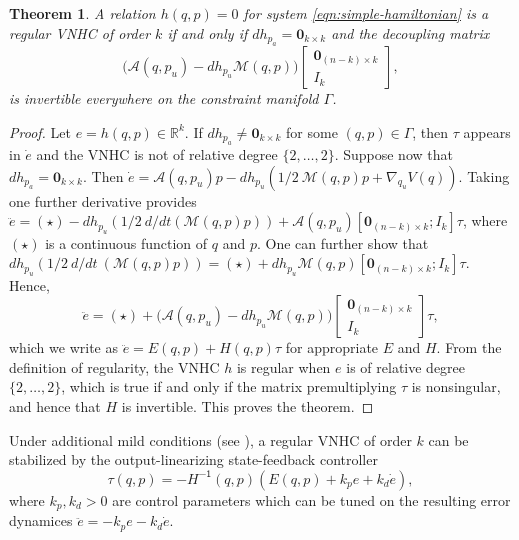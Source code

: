 \documentclass[journal,twoside,web, twocolumn,draftcls]{ieeecolor}
\newtheorem{thm}{Theorem}%
\newcommand*{\inv}{^\mathsf{-1}}
\newcommand*{\R}{\mathbb{R}}
\newcommand*{\Id}[1]{I_{#1}}
\newcommand*{\Zmat}[1]{\bm{0}_{#1}}
\newcommand*{\simpleB}{\begin{bmatrix}\Zmat{(n-k)\times k}\\ \Id{k}\end{bmatrix}}
\begin{document}
\begin{thm}\label{thm:vnhc-regularity}
    A relation \(h(q,p) = 0\) for system \eqref{eqn:simple-hamiltonian}
    is a regular VNHC of order \(k\) if and only if 
    \(dh_{p_a} = \Zmat{k \times k}\) 
    and the decoupling matrix
    \begin{equation}\label{eqn:decoupling-matrix}
        \big(\mathcal{A}(q,p_u) - dh_{p_u}\mathcal{M}(q,p)\big)\simpleB
         ,
     \end{equation}
    is invertible everywhere on the constraint manifold \(\Gamma\).
\end{thm}
\begin{proof}
    Let \(e = h(q,p) \in \R^k\).
    If \(dh_{p_a} \neq \Zmat{k\times k}\) for some \((q,p) \in \Gamma\), 
    then \(\tau\) appears in \(\dot{e}\) and the VNHC is not of relative degree
    \(\{2,\ldots,2\}\). Suppose now that \(dh_{p_a} = \Zmat{k\times k}\).
    Then 
    \(\dot{e} = \mathcal{A}(q,p_u)p - 
     dh_{p_u}\left(1/2~\mathcal{M}(q,p)p + \nabla_{q_u}V(q)\right)\).
    Taking one further derivative provides
    \( \ddot{e} = (\star) - 
        dh_{p_u}\left(1/2~d/dt\left(\mathcal{M}(q,p)p\right)\right) 
        + \mathcal{A}(q,p_u)[\Zmat{(n-k)\times k};\Id{k}] \tau\),
    where \((\star)\) is a continuous function of \(q\) and \(p\).
    One can further show that
    \(dh_{p_u}\left(1/2~d/dt~\left(\mathcal{M}(q,p)p\right)\right)
        = (\star) + dh_{p_u}\mathcal{M}(q,p)[\Zmat{(n-k)\times k};
        \Id{k}]\tau\).
    Hence,
    \[
       \ddot{e} = (\star) +
       \big(\mathcal{A}(q,p_u) - dh_{p_u}\mathcal{M}(q,p)\big) \simpleB \tau
        ,
    \]
    which we write as \( \ddot{e} = E(q,p) + H(q,p)\tau\) for appropriate \(E\)
    and \(H\).
    From the definition of regularity, the VNHC \(h\) is regular 
    when \(e\) is of relative degree \(\{2,\ldots,2\}\), which is true 
    if and only if the matrix premultiplying \(\tau\) is nonsingular, and hence
    that \(H\) is invertible. This proves the theorem.
\end{proof}

Under additional mild conditions (see \cite{vhcs_for_el_systems}), a regular VNHC of
order \(k\) can be stabilized by the output-linearizing state-feedback
controller
\begin{equation}\label{eqn:stabilizing-controller}
    \tau(q,p) = -H\inv(q,p)\left(E(q,p) + k_p e + k_d \dot{e}\right)
    ,
\end{equation}
where \(k_p, k_d > 0\) are control parameters which can be tuned on the
resulting error dynamices \(\ddot{e} = -k_p e - k_d \dot{e}\).
\end{document}
